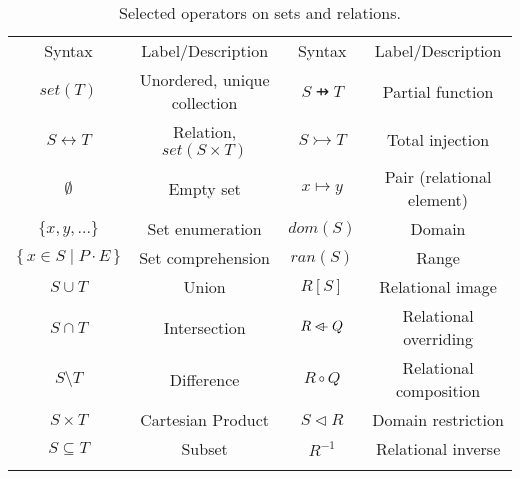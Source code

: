 \documentclass[runningheads]{llncs}
\newcommand{\bSet}[3]{%
  \{\, #1 \mid #2 \cdot #3 \, \}%
}
\begin{document}

\begin{table}[tb]
    \centering
    \caption{Selected operators on sets and relations.}
    \begin{tabular}{|c|c||c|c|}
    \hhline{|--||--|}
    Syntax & Label/Description & Syntax & Label/Description\\
    \hhline{|--||--|}
    $set(T)$ & Unordered, unique collection             & $S \pfun T$ & Partial function \\
    $S \leftrightarrow T$ & Relation, $set(S\times T)$  & $S \tinj T$& Total injection\\
    $\emptyset$ & Empty set                             & $x \mapsto y$ & Pair (relational element) \\
    $\{x,y,...\}$ & Set enumeration                     & $dom(S)$ & Domain\\
    $\bSet{x \in S}{P}{E}$ & Set comprehension          & $ran(S)$ & Range\\
    $S \cup T$ & Union                                  & $R[S]$ & Relational image\\
    $S \cap T$ & Intersection                           & $R \mathbin{\lhd\mkern-9mu-} Q$ & Relational overriding\\
    $S \setminus T$ & Difference                        & $R \circ Q$ & Relational composition\\
    $S \times T$ & Cartesian Product                    & $S \triangleleft R$ & Domain restriction\\
    $S \subseteq T$ & Subset                            & $R^{-1}$ & Relational inverse\\
    \hhline{|--||--|}
    \end{tabular}



\end{table}
\end{document}
